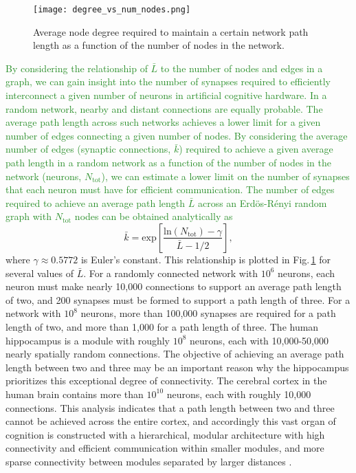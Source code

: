 \documentclass[twocolumn]{article}
\begin{document}
\begin{figure}
    \centering
    \texttt{[image: degree\_vs\_num\_nodes.png]} %
    \caption{Average node degree required to maintain a certain network path length as a function of the number of nodes in the network.}
    \label{fig:degree_vs_num_nodes}
\end{figure}
\textcolor{ForestGreen}{By considering the relationship of $\bar{L}$ to the number of nodes and edges in a graph, we can gain insight into the number of synapses required to efficiently interconnect a given number of neurons in artificial cognitive hardware. In a random network, nearby and distant connections are equally probable. The average path length across such networks achieves a lower limit for a given number of edges connecting a given number of nodes. By considering the average number of edges (synaptic connections, $\bar{k}$) required to achieve a given average path length in a random network as a function of the number of nodes in the network (neurons, $N_{\mathrm{tot}}$), we can estimate a lower limit on the number of synapses that each neuron must have for efficient communication. The number of edges required to achieve an average path length $\bar{L}$ across an Erd\"{o}s-R\'{e}nyi random graph with $N_{\mathrm{tot}}$ nodes can be obtained analytically as \cite{frfr2004}}
\begin{equation}
\bar{k} = \mathrm{exp} \left[ \frac{\mathrm{ln}(N_{\mathrm{tot}})-\gamma}{\bar{L}-1/2} \right],
\end{equation}
where $\gamma \approx 0.5772$ is Euler's constant. This relationship is plotted in Fig.\,\ref{fig:degree_vs_num_nodes} for several values of $\bar{L}$. For a randomly connected network with $10^6$ neurons, each neuron must make nearly 10,000 connections to support an average path length of two, and 200 synapses must be formed to support a path length of three. For a network with $10^8$ neurons, more than 100,000 synapses are required for a path length of two, and more than 1,000 for a path length of three. The human hippocampus is a module with roughly $10^8$ neurons, each with 10,000-50,000 nearly spatially random connections. The objective of achieving an average path length between two and three may be an important reason why the hippocampus prioritizes this exceptional degree of connectivity. The cerebral cortex in the human brain contains more than $10^{10}$ neurons, each with roughly 10,000 connections. This analysis indicates that a path length between two and three cannot be achieved across the entire cortex, and accordingly this vast organ of cognition is constructed with a hierarchical, modular architecture \cite{si1962,ne2006} with high connectivity and efficient communication within smaller modules, and more sparse connectivity between modules separated by larger distances \cite{mo1997,mela2009,bosp2015,beba2017}.
\end{document}

